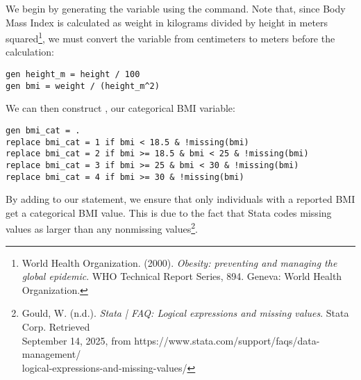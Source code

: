 \documentclass[paper=a4, DIV=12, fontsize=12pt, parskip=full]{scrartcl}
\begin{document}
\maketitle


We begin by generating the  variable using the  command. Note that, since Body Mass Index is calculated as weight in kilograms divided by height in meters squared\footnote{World Health Organization. (2000). \textit{Obesity: preventing and managing the global epidemic}. WHO Technical Report Series, 894. Geneva: World Health Organization.}, we must convert the  variable from centimeters to meters before the calculation:

\begin{verbatim}
gen height_m = height / 100
gen bmi = weight / (height_m^2)
\end{verbatim}

\newpage

We can then construct , our categorical BMI variable:

\begin{verbatim}
gen bmi_cat = .
replace bmi_cat = 1 if bmi < 18.5 & !missing(bmi)
replace bmi_cat = 2 if bmi >= 18.5 & bmi < 25 & !missing(bmi)
replace bmi_cat = 3 if bmi >= 25 & bmi < 30 & !missing(bmi)
replace bmi_cat = 4 if bmi >= 30 & !missing(bmi)    
\end{verbatim}

By adding  to our  statement, we ensure that only individuals with a reported BMI get a categorical BMI value. This is due to the fact that Stata codes missing values as larger than any nonmissing values\footnote{Gould, W. (n.d.). \textit{Stata | FAQ: Logical expressions and missing values}. Stata Corp. Retrieved\\September 14, 2025, from https://www.stata.com/support/faqs/data-management/\\logical-expressions-and-missing-values/}.
\end{document}
